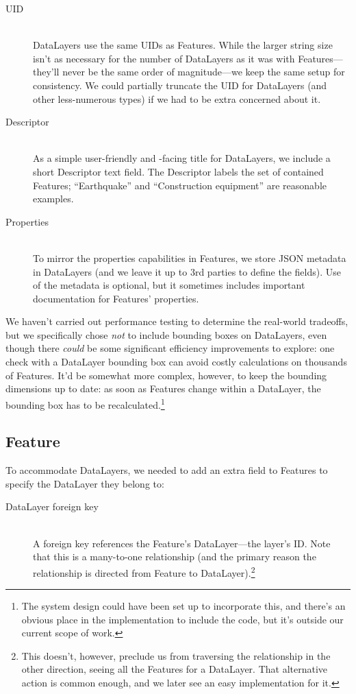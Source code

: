 \begin{description}

\item[UID] \hfill \\
DataLayers use the same UIDs as Features. While the larger string size isn't as necessary for the number of DataLayers as it was with Features---they'll never be the same order of magnitude---we keep the same setup for consistency. We could partially truncate the UID for DataLayers (and other less-numerous types) if we had to be extra concerned about it.

\item[Descriptor] \hfill \\
As a simple user-friendly and -facing title for DataLayers, we include a short Descriptor text field. The Descriptor labels the set of contained Features; ``Earthquake'' and ``Construction equipment'' are reasonable examples.

\item[Properties] \hfill \\
To mirror the properties capabilities in Features, we store JSON metadata in DataLayers (and we leave it up to 3rd parties to define the fields). Use of the metadata is optional, but it sometimes includes important documentation for Features' properties.
  
\end{description}

 We haven't carried out performance testing to determine the real-world tradeoffs, but we specifically chose \textit{not} to include bounding boxes on DataLayers, even though there \textit{could} be some significant efficiency improvements to explore: one check with a DataLayer bounding box can avoid costly calculations on thousands of Features. It'd be somewhat more complex, however, to keep the bounding dimensions up to date: as soon as Features change within a DataLayer, the bounding box has to be recalculated.\footnote{The system design could have been set up to incorporate this, and there's an obvious place in the implementation to include the code, but it's outside our current scope of work.}

\subsection{Feature}
To accommodate DataLayers, we needed to add an extra field to Features to specify the DataLayer they belong to:

\begin{description}

\item[DataLayer foreign key] \hfill \\
A foreign key references the Feature's DataLayer---the layer's ID. Note that this is a many-to-one relationship (and the primary reason the relationship is directed from Feature to DataLayer).\footnote{This doesn't, however, preclude us from traversing the relationship in the other direction, seeing all the Features for a DataLayer. That alternative action is common enough, and we later see an easy implementation for it.}

\end{description}

